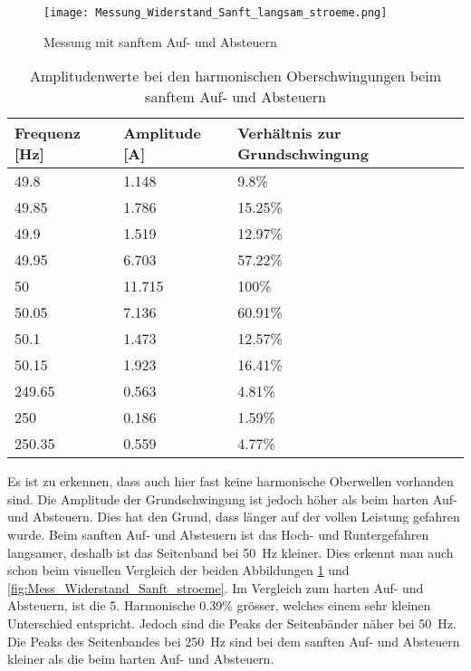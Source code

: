 \begin{figure}[ht!]
	\centering
	\texttt{[image: Messung\_Widerstand\_Sanft\_langsam\_stroeme.png]}	
	\caption{Messung mit sanftem Auf- und Absteuern}\label{fig:Mess_Widerstand_Sanft_langsam_stroeme}
\end{figure}

\begin{table}[ht!]
	\centering
	\begin{tabular}{|l|l|l|}
		\hline
		Frequenz {[}Hz{]} & Amplitude {[}A{]} & Verhältnis zur Grundschwingung	\\ \hline
		49.8              & 1.148             & 9.8\%							\\ \hline
		49.85             & 1.786             & 15.25\%							\\ \hline
		49.9              & 1.519             & 12.97\%							\\ \hline
		49.95             & 6.703             & 57.22\%							\\ \hline
		50                & 11.715            & 100\%							\\ \hline
		50.05             & 7.136             & 60.91\%							\\ \hline
		50.1              & 1.473             & 12.57\%							\\ \hline
		50.15             & 1.923             & 16.41\%							\\ \hline
		249.65            & 0.563             & 4.81\%							\\ \hline
		250               & 0.186             & 1.59\%							\\ \hline
		250.35            & 0.559             & 4.77\%							\\ \hline
	\end{tabular}
	\caption{Amplitudenwerte bei den harmonischen Oberschwingungen beim sanftem Auf- und Absteuern}\label{tab:Sanft_langsam_stroeme}
\end{table}
Es ist zu erkennen, dass auch hier fast keine harmonische Oberwellen vorhanden sind. Die Amplitude der Grundschwingung ist jedoch höher als beim harten Auf- und Absteuern. Dies hat den Grund, dass länger auf der vollen Leistung gefahren wurde. Beim sanften Auf- und Absteuern ist das Hoch- und Runtergefahren langsamer, deshalb ist das Seitenband bei \SI{50}{Hz} kleiner. Dies erkennt man auch schon beim visuellen Vergleich der beiden Abbildungen \ref{fig:Mess_Widerstand_Sanft_langsam_stroeme} und \ref{fig:Mess_Widerstand_Sanft_stroeme}. Im Vergleich zum harten Auf- und Absteuern, ist die 5. Harmonische 0.39\% grösser, welches einem sehr kleinen Unterschied entspricht. Jedoch sind die Peaks der Seitenbänder näher bei \SI{50}{Hz}. Die Peaks des Seitenbandes bei \SI{250}{Hz} sind bei dem sanften Auf- und Absteuern kleiner als die beim harten Auf- und Absteuern.



